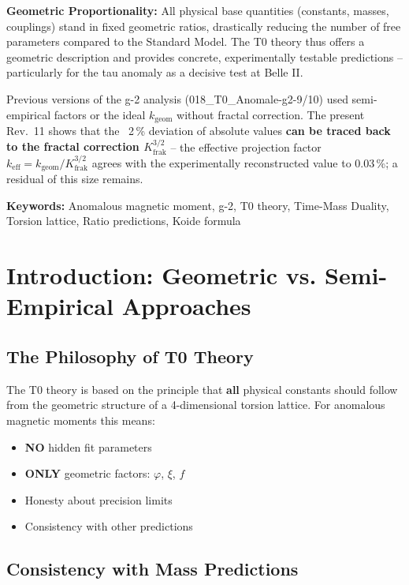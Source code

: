 		\textbf{Geometric Proportionality:} All physical base quantities (constants, masses, couplings) stand in fixed geometric ratios, drastically reducing the number of free parameters compared to the Standard Model. The T0 theory thus offers a geometric description and provides concrete, experimentally testable predictions – particularly for the tau anomaly as a decisive test at Belle II.

	
	\begin{tcolorbox}[colback=yellow!10!white, colframe=orange!75!black, title=Note on Older Documents]
		Previous versions of the g-2 analysis (018\_T0\_Anomale-g2-9/10) used semi-empirical factors or the ideal $k_\text{geom}$ without fractal correction. The present Rev.~11 shows that the ~2\,\% deviation of absolute values \textbf{can be traced back to the fractal correction $K_\text{frak}^{3/2}$} -- the effective projection factor $k_\text{eff} = k_\text{geom}/K_\text{frak}^{3/2}$ agrees with the experimentally reconstructed value to 0.03\,\%; a residual of this size remains.
	\end{tcolorbox}
	
	\textbf{Keywords:} Anomalous magnetic moment, g-2, T0 theory, Time-Mass Duality, Torsion lattice, Ratio predictions, Koide formula
	
	
	\section{Introduction: Geometric vs. Semi-Empirical Approaches}
	
	\subsection{The Philosophy of T0 Theory}
	
	The T0 theory is based on the principle that \textbf{all} physical constants should follow from the geometric structure of a 4-dimensional torsion lattice. For anomalous magnetic moments this means:
	
	\begin{itemize}
		\item \textbf{NO} hidden fit parameters
		\item \textbf{ONLY} geometric factors: $\varphi$, $\xi$, $f$
		\item Honesty about precision limits
		\item Consistency with other predictions
	\end{itemize}
	
	\subsection{Consistency with Mass Predictions}
	
